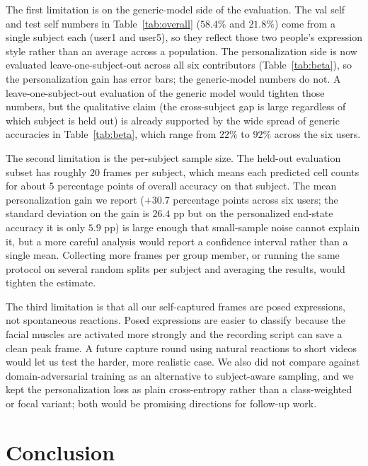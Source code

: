 \documentclass[12pt,a4paper]{article}
\begin{document}
The first limitation is on the generic-model side of the
evaluation. The val self and test self numbers in
Table~\ref{tab:overall} ($58.4\%$ and $21.8\%$) come from a
single subject each (user1 and user5), so they reflect those
two people's expression style rather than an average across a
population. The personalization side is now evaluated
leave-one-subject-out across all six contributors
(Table~\ref{tab:beta}), so the personalization gain has error
bars; the generic-model numbers do not. A leave-one-subject-out
evaluation of the generic model would tighten those numbers,
but the qualitative claim (the cross-subject gap is large
regardless of which subject is held out) is already supported
by the wide spread of generic accuracies in
Table~\ref{tab:beta}, which range from $22\%$ to $92\%$
across the six users.

The second limitation is the per-subject sample size. The
held-out evaluation subset has roughly $20$ frames per
subject, which means each predicted cell counts for about $5$
percentage points of overall accuracy on that subject. The
mean personalization gain we report ($+30.7$ percentage points
across six users; the standard deviation on the gain is
$26.4$ pp but on the personalized end-state accuracy it is
only $5.9$ pp) is large enough that small-sample noise cannot
explain it, but a more careful analysis would report a
confidence interval rather than a single mean. Collecting more frames per group member,
or running the same protocol on several random splits per
subject and averaging the results, would tighten the
estimate.

The third limitation is that all our self-captured frames are
posed expressions, not spontaneous reactions. Posed expressions
are easier to classify because the facial muscles are activated
more strongly and the recording script can save a clean peak
frame. A future capture round using natural reactions to short
videos would let us test the harder, more realistic case. We
also did not compare against domain-adversarial training
\autocite{ganin2015dann} as an alternative to subject-aware
sampling, and we kept the personalization loss as plain
cross-entropy rather than a class-weighted or focal variant;
both would be promising directions for follow-up work.

\section{Conclusion}
\label{sec:conclusion}
\end{document}
